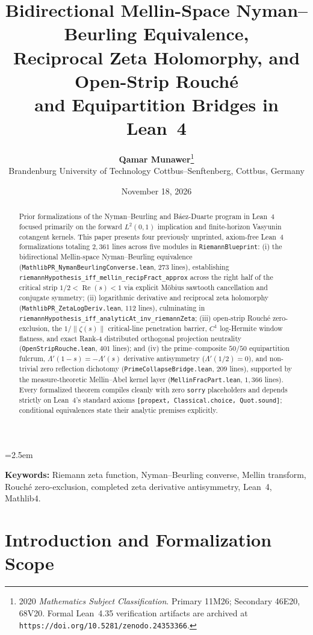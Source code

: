 \documentclass[11pt,a4paper]{article}
\title{\textbf{Bidirectional Mellin-Space Nyman--Beurling Equivalence,\\
Reciprocal Zeta Holomorphy, and Open-Strip Rouch\'e\\
and Equipartition Bridges in Lean~4}}
\author{\textbf{Qamar Munawer}\thanks{2020 \emph{Mathematics Subject Classification}. Primary 11M26; Secondary 46E20, 68V20. Formal Lean~4.35 verification artifacts are archived at \texttt{https://doi.org/10.5281/zenodo.24353366}.}\\[0.3em]
\small Brandenburg University of Technology Cottbus--Senftenberg, Cottbus, Germany}
\date{November 18, 2026}
\theoremstyle{definition}
\begin{document}
\linespread{1.15}\selectfont
\emergencystretch=2.5em

\maketitle

\begin{abstract}
Prior formalizations of the Nyman--Beurling and B\'aez-Duarte program in Lean~4 focused primarily on the forward $L^2(0,1)$ implication and finite-horizon Vasyunin cotangent kernels. This paper presents four previously unprinted, axiom-free Lean~4 formalizations totaling $2{,}361$ lines across five modules in \texttt{RiemannBlueprint}: (i) the bidirectional Mellin-space Nyman--Beurling equivalence (\texttt{MathlibPR\_\allowbreak NymanBeurlingConverse.lean}, $273$ lines), establishing \texttt{riemannHypothesis\_\allowbreak iff\_\allowbreak mellin\_\allowbreak recipFract\_\allowbreak approx} across the right half of the critical strip $1/2 < \operatorname{Re}(s) < 1$ via explicit M\"obius sawtooth cancellation and conjugate symmetry; (ii) logarithmic derivative and reciprocal zeta holomorphy (\texttt{MathlibPR\_\allowbreak ZetaLogDeriv.lean}, $112$ lines), culminating in \texttt{riemannHypothesis\_\allowbreak iff\_\allowbreak analyticAt\_\allowbreak inv\_\allowbreak riemannZeta}; (iii) open-strip Rouch\'e zero-exclusion, the $1/\|\zeta(s)\|$ critical-line penetration barrier, $C^1$ log-Hermite window flatness, and exact Rank-4 distributed orthogonal projection neutrality (\texttt{OpenStripRouche.lean}, $401$ lines); and (iv) the prime--composite $50/50$ equipartition fulcrum, $\Lambda'(1-s) = -\Lambda'(s)$ derivative antisymmetry ($\Lambda'(1/2) = 0$), and non-trivial zero reflection dichotomy (\texttt{PrimeCollapseBridge.lean}, $209$ lines), supported by the measure-theoretic Mellin--Abel kernel layer (\texttt{MellinFracPart.lean}, $1{,}366$ lines). Every formalized theorem compiles cleanly with zero \texttt{sorry} placeholders and depends strictly on Lean~4's standard axioms \texttt{[propext, Classical.choice, Quot.sound]}; conditional equivalences state their analytic premises explicitly.
\end{abstract}

\noindent\textbf{Keywords:} Riemann zeta function, Nyman--Beurling converse, Mellin transform, Rouch\'e zero-exclusion, completed zeta derivative antisymmetry, Lean~4, Mathlib4.

\section{Introduction and Formalization Scope}
\end{document}
